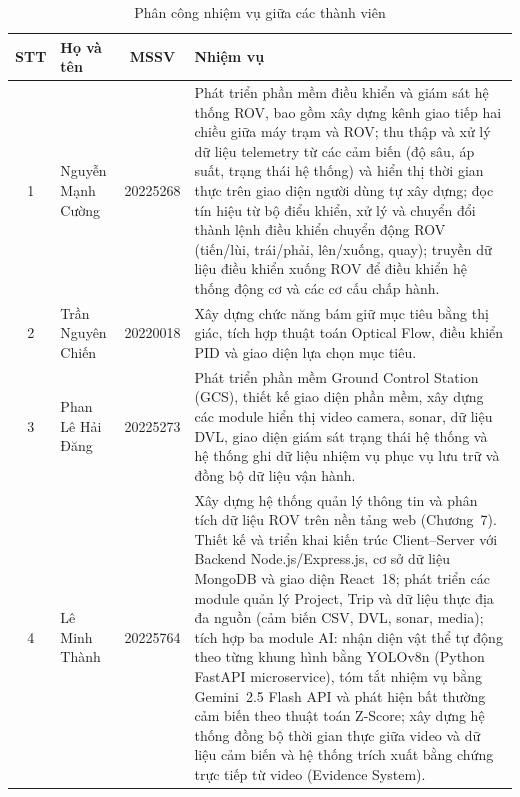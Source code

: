 \documentclass[../DoAn.tex]{subfiles}
\begin{document}
\begin{table}[H]
\centering
\renewcommand{\arraystretch}{1.4}
\begin{tabular}{|c|p{4cm}|c|p{7cm}|}
\hline
\textbf{STT} & \textbf{Họ và tên} & \textbf{MSSV} & \textbf{Nhiệm vụ} \\
\hline

1 & Nguyễn Mạnh Cường & 20225268 &Phát triển phần mềm điều khiển và giám sát hệ thống ROV, bao gồm xây dựng kênh giao tiếp hai chiều giữa máy trạm và ROV; thu thập và xử lý dữ liệu telemetry từ các cảm biến (độ sâu, áp suất, trạng thái hệ thống) và hiển thị thời gian thực trên giao diện người dùng tự xây dựng; đọc tín hiệu từ bộ điểu khiển, xử lý và chuyển đổi thành lệnh điều khiển chuyển động ROV (tiến/lùi, trái/phải, lên/xuống, quay); truyền dữ liệu điều khiển xuống ROV để điều khiển hệ thống động cơ và các cơ cấu chấp hành.\\
\hline

2 & Trần Nguyên Chiến & 20220018 &Xây dựng chức năng bám giữ mục tiêu bằng thị giác, tích hợp thuật toán Optical Flow, điều khiển PID và giao diện lựa chọn mục tiêu.\\
\hline

3 & Phan Lê Hải Đăng & 20225273 &
Phát triển phần mềm Ground Control Station (GCS), thiết kế giao diện phần mềm, xây dựng các module hiển thị video camera, sonar, dữ liệu DVL, giao diện giám sát trạng thái hệ thống và hệ thống ghi dữ liệu nhiệm vụ phục vụ lưu trữ và đồng bộ dữ liệu vận hành. \\
\hline

4 & Lê Minh Thành & 20225764 &
Xây dựng hệ thống quản lý thông tin và phân tích dữ liệu ROV trên nền tảng web (Chương~7). Thiết kế và triển khai kiến trúc Client--Server với Backend Node.js/Express.js, cơ sở dữ liệu MongoDB và giao diện React~18; phát triển các module quản lý Project, Trip và dữ liệu thực địa đa nguồn (cảm biến CSV, DVL, sonar, media); tích hợp ba module AI: nhận diện vật thể tự động theo từng khung hình bằng YOLOv8n (Python FastAPI microservice), tóm tắt nhiệm vụ bằng Gemini~2.5 Flash API và phát hiện bất thường cảm biến theo thuật toán Z-Score; xây dựng hệ thống đồng bộ thời gian thực giữa video và dữ liệu cảm biến và hệ thống trích xuất bằng chứng trực tiếp từ video (Evidence System). \\
\hline


\end{tabular}
\caption{Phân công nhiệm vụ giữa các thành viên}
\label{tab:phancongnhiemvu}
\end{table}
\end{document}
